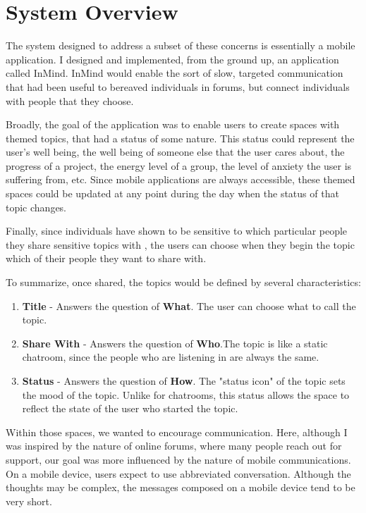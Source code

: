 \chapter{System Overview}
  The system designed to address a subset of these concerns is essentially a mobile application.
  I designed and implemented,
  from the ground up, an application called InMind.
  InMind would enable the sort of slow,
  targeted communication that had been useful to bereaved individuals in forums,
  but connect individuals with people that they choose.

  Broadly, the goal of the application was to enable users to create spaces
  with themed topics, that had a status of some nature.
  This status could represent the user's well being, the well being of someone else
  that the user cares about, the progress of a project, the energy level of a group,
  the level of anxiety the user is suffering from, etc.
  Since mobile applications are always accessible,
  these themed spaces could be updated at any point
  during the day when the status of that topic changes.

  Finally, since individuals have shown to be sensitive
  to which particular people they share
  sensitive topics with \cite{},
  the users can choose when they begin the topic
  which of their people they want to share with.

  To summarize, once shared, the topics would be defined by several characteristics:

  \begin{enumerate}
  \item \textbf{Title} - Answers the question of \textbf{What}. The user can choose what to call the topic.
  \item \textbf{Share With} - Answers the question of \textbf{Who}.The topic is like a static chatroom,
    since the people who are listening in are always the same.
  \item \textbf{Status} - Answers the question of \textbf{How}. The "status icon" of the topic sets the mood
    of the topic. Unlike for chatrooms,
    this status allows the space to reflect the state
    of the user who started the topic.
  \end{enumerate}

  Within those spaces, we wanted to encourage communication.
  Here, although I was inspired by the nature of online forums,
  where many people reach out for support,
  our goal was more influenced by the nature of mobile communications.
  On a mobile device, users expect to use abbreviated conversation.
  Although the thoughts may be complex, the messages composed on a mobile device
  tend to be very short.

